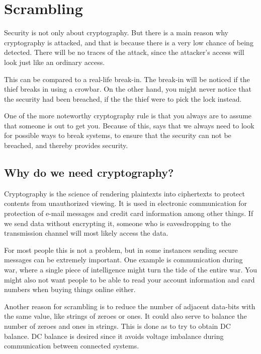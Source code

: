 \chapter{Scrambling}\label{ch:Scrambling}
Security is not only about cryptography. But there is a main reason why 
cryptography is attacked, and that is because there is a very low chance of being
detected. There will be no traces of the attack, since the attacker’s access will
look just like an ordinary access.

This can be compared to a real-life break-in. The break-in will be noticed if 
the thief breaks in using a crowbar. On the other hand, you might never notice 
that the security had been breached, if the the thief were to pick the lock 
instead. \citep{Schneier:2003}

One of the more noteworthy cryptography rule is that you always are to assume 
that someone is out to get you. Because of this, 
\citet[pp. 12--14]{Schneier:2003} says that we always need to look for possible 
ways to break systems, to ensure that the security can not be breached, and 
thereby provides security.

\section{Why do we need cryptography?}
Cryptography is the science of rendering plaintexts into ciphertexts to 
protect contents from unauthorized viewing. It is used in electronic 
communication for protection of e-mail messages and credit card information 
among other things. If we send data without encrypting it, someone who is 
eavesdropping to the transmission channel will most likely access the data.

For most people this is not a problem, but in some instances sending secure 
messages can be extremely important. One example is communication during war, 
where a single piece of intelligence might turn the tide of the entire war. You 
might also not want people to be able to read your account information and card 
numbers when buying things online either.


Another reason for scrambling is to reduce the number of adjacent data-bits with 
the same value, like strings of zeroes or ones. It could also serve to balance 
the number of zeroes and ones in strings. This is done as to try to obtain DC 
balance. DC balance is desired since it avoids voltage imbalance during 
communication between connected systems. 

